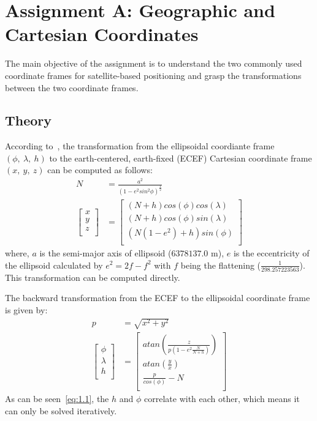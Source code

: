 \chapter{Assignment A: Geographic and Cartesian Coordinates}
The main objective of the assignment is to understand the two commonly used coordinate frames for satellite-based positioning and grasp the transformations between the two coordinate frames. 

\section{Theory}
According to~\cite{misra2006global}, the transformation from the ellipsoidal coordiante frame $(\phi,\ \lambda,\ h)$ to the earth-centered, earth-fixed (ECEF) Cartesian coordinate frame $(x,\ y,\ z)$ can be computed as follows:
\begin{align}
	N &= \frac{a^2}{(1-e^2sin^2{\phi})^{\frac{1}{2}}} \\
	\left[\begin{matrix}
		x \\
		y \\
		z \\
	\end{matrix}\right] &= \left[\begin{matrix}
	(N+h) cos(\phi)cos(\lambda) \\
	(N+h) cos(\phi)sin(\lambda) \\
	(N(1-e^2)+h)sin(\phi) \\
	\end{matrix}\right] 
\end{align}
where, $a$ is the semi-major axis of ellipsoid ($6378137.0$ m), $e$ is the eccentricity of the ellipsoid calculated by $e^2=2f-f^2$ with $f$ being the flattening ($\frac{1}{298.257223563}$). This transformation can be computed directly.

The backward transformation from the ECEF to the ellipsoidal coordinate frame is given by:
\begin{align}
	p &= \sqrt{x^2+y^2}\\
\left[
	\begin{matrix}
	\phi \\
	\lambda \\
	h \\
	\end{matrix}
\right] &= \left[
	\begin{matrix}
	atan(\frac{z}{p(1-e^2\frac{N}{N+h})}) \\
	atan(\frac{y}{x}) \\
	\frac{p}{cos(\phi)}-N \\
	\end{matrix}
\right]
\label{eq:1.1}
\end{align}
As can be seen~\eqref{eq:1.1}, the $h$ and $\phi$ correlate with each other, which means it can only be solved iteratively. 

